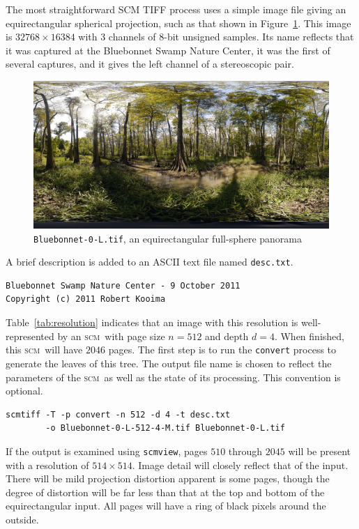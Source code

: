 \documentclass[oneside,11pt]{memoir}
\newcommand{\scm}     {\textsc{scm}}
\newcommand{\scmview} {\texttt{scmview}}
\begin{document}
\begin{Spacing}{1.1}
The most straightforward SCM TIFF process uses a simple image file giving an equirectangular spherical projection, such as that shown in Figure~\ref{fig:bluebonnet}. This image is $32768\times 16384$ with 3 channels of 8-bit unsigned samples. Its name reflects that it was captured at the Bluebonnet Swamp Nature Center, it was the first of several captures, and it gives the left channel of a stereoscopic pair.

\begin{figure}
  \centering
  \includegraphics[width=\textwidth]{fig/bluebonnet.png}
  \caption{\texttt{Bluebonnet-0-L.tif}, an equirectangular full-sphere panorama}
  \label{fig:bluebonnet}
\end{figure}

A brief description is added to an ASCII text file named \texttt{desc.txt}.

\begin{verbatim}
Bluebonnet Swamp Nature Center - 9 October 2011
Copyright (c) 2011 Robert Kooima
\end{verbatim}

Table~\ref{tab:resolution} indicates that an image with this resolution is well-represented by an \scm\ with page size $n=512$ and depth $d=4$. When finished, this \scm\ will have $2046$ pages. The first step is to run the \texttt{convert} process to generate the leaves of this tree. The output file name is chosen to reflect the parameters of the \scm\ as well as the state of its processing. This convention is optional.

\begin{verbatim}
scmtiff -T -p convert -n 512 -d 4 -t desc.txt
        -o Bluebonnet-0-L-512-4-M.tif Bluebonnet-0-L.tif
\end{verbatim}

If the output is examined using \scmview, pages $510$ through $2045$ will be present with a resolution of $514\times 514$. Image detail will closely reflect that of the input. There will be mild projection distortion apparent is some pages, though the degree of distortion will be far less than that at the top and bottom of the equirectangular input. All pages will have a ring of black pixels around the outside.


\end{Spacing}
\end{document}
